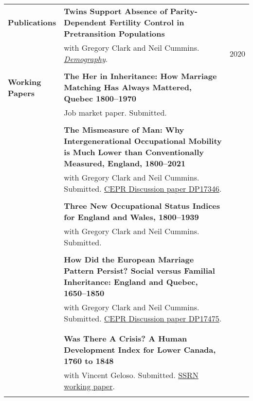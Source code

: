\documentclass[a4paper,11pt,oneside]{article}
\begin{document}
\begin{longtable}{@{} p{0.175\linewidth} p{0.775\linewidth} p{0.05\linewidth}}
     \textbf{\large{Publications}}   & \textbf{Twins Support Absence of Parity-Dependent Fertility Control in Pretransition Populations }\\
     &  with Gregory Clark and Neil Cummins. \href{https://read.dukeupress.edu/demography/article/57/4/1571/168109/Twins-Support-the-Absence-of-Parity-Dependent}{\emph{Demography}}. & \hfill 2020\\
     \\  


     \textbf{\large{Working \(\phantom{1}\)  Papers}}  & \textbf{The Her in Inheritance: How Marriage Matching Has Always Mattered, Quebec 1800--1970}\\ 
     &  Job market paper. Submitted. &  \\
        & &
       \\

    & \textbf{The Mismeasure of Man: Why Intergenerational Occupational Mobility  is Much Lower than Conventionally Measured, England, 1800--2021}\\ 
    &  with Gregory Clark and Neil Cummins. Submitted. \href{https://hub.cepr.org/published-discussion-paper/139739}{CEPR Discussion paper DP17346}. &    \\
       & &
      \\  
      & \textbf{Three New Occupational Status Indices for England and Wales, 1800--1939}\\ 
      &  with Gregory Clark and Neil Cummins. Submitted. &   \\
     \\

 & \textbf{How Did the European Marriage Pattern Persist? Social versus Familial Inheritance: England and Quebec, 1650--1850 }\\ 
     &   with Gregory Clark and Neil Cummins. Submitted. \href{https://hub.cepr.org/published-discussion-paper/170950}{CEPR Discussion paper DP17475}. & \\
      \\

      \\
     &  \textbf{Was There A Crisis? A Human Development Index for Lower Canada, 1760 to 1848 } \\ 
      &   with Vincent Geloso. Submitted. \href{https://papers.ssrn.com/sol3/papers.cfm?abstract_id=4200516}{SSRN working paper}. &  \\
      \\ 
 

\end{longtable}
\end{document}
